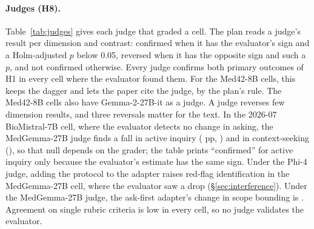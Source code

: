 \documentclass{article}
\begin{document}
\paragraph{Judges (H8).} Table~\ref{tab:judges} gives each judge that graded a cell. The plan
reads a judge's result per dimension and contrast: confirmed when it has the evaluator's sign and
a Holm-adjusted $p$ below 0.05, reversed when it has the opposite sign and such a $p$, and not
confirmed otherwise. Every judge confirms both primary outcomes of H1 in every cell where the evaluator found
them. For the Med42-8B cells, this keeps the dagger and lets the paper cite the judge, by the plan's
rule. The Med42-8B cells also have Gemma-2-27B-it as a judge. A judge reverses few dimension
results, and three reversals matter for the text. In the 2026-07 BioMistral-7B cell, where the
evaluator detects no change in asking, the MedGemma-27B judge finds a fall in active inquiry
(\statHBBioMistralJulJudgeMedgemmaTwoSevenbTextActiveInquiryLoRAvsBaseDiff{} pp,
\statHBBioMistralJulJudgeMedgemmaTwoSevenbTextActiveInquiryLoRAvsBaseCI) and in context-seeking
(\statHBBioMistralJulJudgeMedgemmaTwoSevenbTextContextSeekingLoRAvsBaseDiff), so that null depends on the
grader; the table prints ``confirmed'' for active inquiry only because the evaluator's estimate has
the same sign. Under the Phi-4 judge, adding the protocol to the adapter raises red-flag identification in the MedGemma-27B
cell, where the evaluator saw a drop (\S\ref{sec:interference}). Under the MedGemma-27B judge, the
ask-first adapter's change in scope bounding is \statHBMistralAskFirstJudgeMedgemmaTwoSevenbTextScopeBoundingLoRAvsBaseDecision.
Agreement on single rubric criteria is low in every cell, so no judge validates the evaluator.

\begin{table}[!ht]
\centering
\caption{Judges from families other than the evaluator's (H8). $\kappa$: Cohen's kappa of the
judge against the evaluator on the rubric criteria, with a prompt-clustered bootstrap interval.
Active inquiry and context-seeking: the judge's decision on LoRA $-$ Base. Reversed: dimension
results that the judge reverses, over every contrast of the cell. Top block: the cells of
Table~\ref{tab:cells}; bottom block: the cells of \S\ref{sec:rerun}. $^{\dagger}$Base
model in the evaluator's family.}
\label{tab:judges}
\scriptsize
\setlength{\tabcolsep}{3pt}
\resizebox{\linewidth}{!}{}
\end{table}
\end{document}
